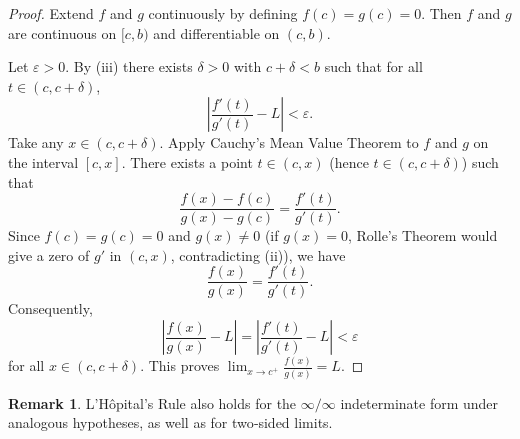 \documentclass[12pt,a4paper]{article}
\theoremstyle{definition}
\newtheorem*{remark}{Remark}
\newcommand{\eps}{\varepsilon}
\newcommand{\abs}[1]{\left\lvert#1\right\rvert}
\begin{document}
\begin{proof}
Extend \(f\) and \(g\) continuously by defining \(f(c)=g(c)=0\). Then \(f\) and \(g\) are continuous on \([c,b)\) and differentiable on \((c,b)\).

Let \(\eps>0\). By (iii) there exists \(\delta>0\) with \(c+\delta<b\) such that for all \(t\in(c,c+\delta)\),
\[
\abs{\frac{f'(t)}{g'(t)} - L} < \eps.
\]
Take any \(x\in(c,c+\delta)\). Apply Cauchy's Mean Value Theorem to \(f\) and \(g\) on the interval \([c,x]\). There exists a point \(t\in(c,x)\) (hence \(t\in(c,c+\delta)\)) such that
\[
\frac{f(x)-f(c)}{g(x)-g(c)} = \frac{f'(t)}{g'(t)}.
\]
Since \(f(c)=g(c)=0\) and \(g(x)\neq0\) (if \(g(x)=0\), Rolle's Theorem would give a zero of \(g'\) in \((c,x)\), contradicting (ii)), we have
\[
\frac{f(x)}{g(x)} = \frac{f'(t)}{g'(t)}.
\]
Consequently,
\[
\abs{\frac{f(x)}{g(x)} - L} = \abs{\frac{f'(t)}{g'(t)} - L} < \eps
\]
for all \(x\in(c,c+\delta)\). This proves \(\lim_{x\to c^+}\frac{f(x)}{g(x)}=L\).
\end{proof}

\begin{remark}
L'H\^opital's Rule also holds for the \(\infty/\infty\) indeterminate form under analogous hypotheses, as well as for two‑sided limits.
\end{remark}
\end{document}
